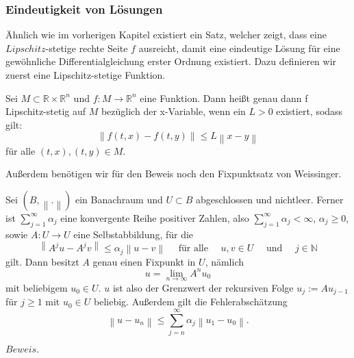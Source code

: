 \subsubsection{Eindeutigkeit von Lösungen}
Ähnlich wie im vorherigen Kapitel existiert ein Satz, welcher zeigt, dass eine $Lipschitz$-stetige
rechte Seite $f$ ausreicht, damit eine eindeutige Lösung für eine
gewöhnliche Differentialgleichung erster Ordnung existiert. Dazu definieren wir zuerst eine Lipschitz-stetige Funktion.
\begin{definition}
    Sei $M \subset \mathbb{R} \times \mathbb{R}^{n}$ und $f: M \rightarrow \mathbb{R}^n$ eine Funktion. Dann heißt genau
    dann f Lipschitz-stetig auf $M$ bezüglich der x-Variable, wenn ein $L>0$ existiert, sodass gilt:
    \[
        \left\lVert f(t,x) - f(t,y) \right\rVert \leq L \left\lVert x - y  \right\rVert
    \]
    für alle $(t,x), (t,y) \in M$.
\end{definition}
Außerdem benötigen wir für den Beweis noch den Fixpunktsatz von Weissinger.
\begin{satz}
    Sei $\left( B, \left\lVert . \right\rVert \right) $ ein Banachraum und $U \subset B$ abgeschlossen und nichtleer.
    Ferner ist $\sum_{j=1}^{\infty} \alpha_j$ eine konvergente Reihe positiver Zahlen, also
    $\sum_{j=1}^{\infty} \alpha_j < \infty $, $\alpha_j \geq 0$, sowie $A:U \rightarrow U$ eine Selbstabbildung, für die
    \[
        \left\lVert A^{j}u - A^{j}v \right\rVert \leq \alpha_j \left\lVert u - v \right\rVert \quad \text{ für alle }
        \quad u,v \in U \quad \text{ und } \quad j \in \mathbb{N}
    \]
    gilt. Dann besitzt $A$ genau einen Fixpunkt in $U$, nämlich
    \[
        u = \lim_{n\rightarrow \infty} A^{n}u_0
    \]
    mit beliebigem $u_0 \in U$. $u$ ist also der Grenzwert der rekursiven Folge $u_j:=Au_{j-1}$ für $j \geq 1$
    mit $u_0 \in U$ beliebig. Außerdem gilt die Fehlerabschätzung
    \[
        \left\lVert u - u_n \right\rVert \leq \sum_{j=n}^{\infty} \alpha_j \left\lVert u_1 - u_0 \right\rVert.
    \]
\end{satz}
$Beweis.$ \cite[139]{harroheuserGewohnlicheDifferentialgleichungen}\\
